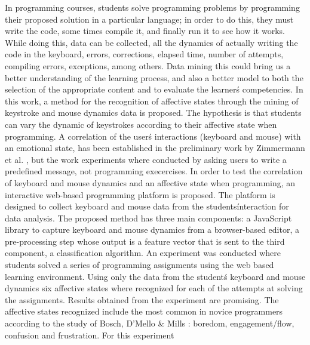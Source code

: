\documentclass[a4paper,twoside]{article}
\begin{document}
In programming courses, students solve programming problems by programming their
proposed solution in a particular language; in order to do this, they must write the code,
some times compile it, and finally run it to see how it works. 
While doing this, data can be collected, all the dynamics of actually writing 
the code in the keyboard, errors, corrections, elapsed time, number of attempts,
compiling errors, exceptions, among others. Data mining this could
bring us a better understanding of the learning process, and also a better model to 
both the selection of the appropriate content and to evaluate the learner\'s competencies.
In this work, a method for the recognition of affective states through the
mining of keystroke and mouse dynamics data is proposed. 
The hypothesis is that students can vary the dynamic of keystrokes according 
to their affective state when programming. A correlation of the 
user\'s interactions (keyboard and mouse) with an emotional state, has been 
established in the preliminary work by Zimmermann
et al. \cite{zimmermann2003affective}, but the work experiments where
conducted by asking users to write a predefined message, not programming
execercises. 
In order to test the correlation of keyboard and mouse dynamics and an
affective state when programming, an interactive web-based 
programming platform is proposed. The platform is designed to collect
keyboard and mouse data from the students\' interaction for data analysis.
The proposed method has three main components: a JavaScript library to capture keyboard and mouse
dynamics from a browser-based editor, a pre-processing step whose output is a
feature vector that is sent to the third component, a classification algorithm.
An experiment was conducted where students solved a series of programming
assignments using the web based learning environment. Using only the data from the
student\'s keyboard and mouse dynamics six affective states where recognized for
each of the attempts at solving the assignments. Results obtained from the
experiment are promising. The affective states recognized include the most
common in novice programmers according to the study of Bosch, D'Mello \& Mills
\cite{bixler2013detecting}: boredom, engagement/flow, confusion and frustration. For this experiment
\end{document}
